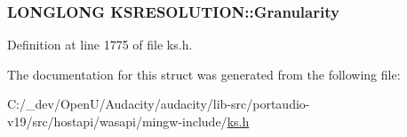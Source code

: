 \subsubsection[{\texorpdfstring{Granularity}{Granularity}}]{\setlength{\rightskip}{0pt plus 5cm}L\+O\+N\+G\+L\+O\+NG K\+S\+R\+E\+S\+O\+L\+U\+T\+I\+O\+N\+::\+Granularity}\hypertarget{struct_k_s_r_e_s_o_l_u_t_i_o_n_a92a6f90dedb6ec2f4884d442c06e0721}{}\label{struct_k_s_r_e_s_o_l_u_t_i_o_n_a92a6f90dedb6ec2f4884d442c06e0721}


Definition at line 1775 of file ks.\+h.



The documentation for this struct was generated from the following file\+:\begin{DoxyCompactItemize}
\item 
C\+:/\+\_\+dev/\+Open\+U/\+Audacity/audacity/lib-\/src/portaudio-\/v19/src/hostapi/wasapi/mingw-\/include/\hyperlink{ks_8h}{ks.\+h}\end{DoxyCompactItemize}
